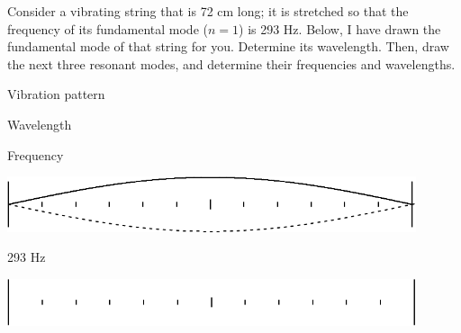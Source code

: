 \documentclass[12pt]{article}
\begin{document}
\Large
\centerline{}
\normalsize
\centerline{}

Consider a vibrating string that is 72 cm long; it is stretched so that the frequency of its fundamental mode ($n=1$) is 293 Hz. Below, I have drawn the fundamental mode of that string for you. Determine its wavelength. Then, draw the next three resonant modes, and determine their frequencies and wavelengths.
\vspace{0.5in}


\begin{minipage}{0.5\textwidth}
	\begin{center}
\Large		Vibration pattern
	\end{center}
\end{minipage}
\begin{minipage}{0.25\textwidth}
	\Large \begin{center}Wavelength\end{center}
\end{minipage}
\begin{minipage}{0.25\textwidth}
\Large	\begin{center}Frequency\end{center}
\end{minipage}


\begin{minipage}{0.5\textwidth}
	\begin{center}
\includegraphics[width=0.9\textwidth]{fund-crop.pdf}
	\end{center}
\end{minipage}
\begin{minipage}{0.25\textwidth}
\hspace{0.5in}
\end{minipage}
\begin{minipage}{0.25\textwidth}
\begin{center}
	\Large 293 Hz
\end{center}	
\end{minipage}

\vspace{0.5in}
\begin{minipage}{0.5\textwidth}
	\begin{center}
		\includegraphics[width=0.9\textwidth]{string-crop.pdf}
	\end{center}
\end{minipage}
\begin{minipage}{0.25\textwidth}
	\hspace{0.5in}
\end{minipage}
\begin{minipage}{0.25\textwidth}
	\begin{center}

	\end{center}	
\end{minipage}
\end{document}
